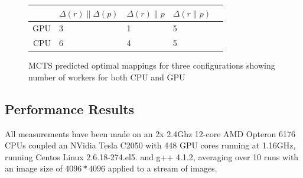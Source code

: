 \documentclass[smallextended]{svjour3}
\begin{document}
\begin{figure}
\begin{center}
\begin{tabular}{| r | l | l | l | l |}
\hline
 &  $ \Delta(r) \parallel \Delta(p) $ &  $\Delta(r) \parallel p$ & $\Delta(r \parallel p)$ \tabularnewline
\hline
\hline
GPU & 3 & 1 & 5  \tabularnewline
\hline
CPU & 6 & 4 & 5 \tabularnewline
\hline
\end{tabular}
\caption{MCTS predicted optimal mappings for three configurations showing number of workers for both CPU and GPU}
\label{fig:predicts}
\end{center}
\end{figure}

\subsection{Performance Results} \label{sec:performance}
\noindent
All measurements have been made on an 2x 2.4Ghz 12-core AMD Opteron 6176 CPUs coupled an NVidia Tesla C2050 with 448 GPU
cores running at 1.16GHz, running Centos Linux 
2.6.18-274.el5. and g++ 4.1.2, averaging over 10 runs with an image size of $4096*4096$ applied to a stream of images.
\end{document}
